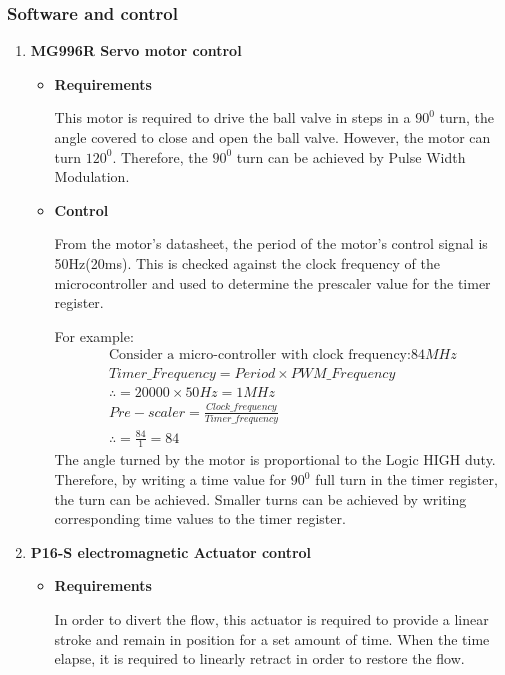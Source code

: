 \subsubsection{Software and control}

\begin{enumerate}
    \item \textbf{MG996R Servo motor control}
    \par
    \begin{itemize}
        \item \textbf{Requirements}
        \par
        This motor is required to drive the ball valve in steps in a $90^{0}$ turn, the angle covered to close and open the ball valve. However, the motor can turn $120^{0}$. Therefore, the $90^{0}$ turn can be achieved by Pulse Width Modulation. 
        \item \textbf{Control}
        \par
        From the motor's datasheet, the period of the motor's control signal is 50Hz(20ms). This is checked against the clock frequency of the microcontroller and used to determine the prescaler value for the timer register.
        \par
        For example:
        \begin{align*}
            \text{Consider a micro-controller with clock frequency:} 84MHz \\
            Timer\_Frequency = Period \times PWM\_Frequency\\
            \therefore = 20000 \times 50 Hz  = 1MHz\\
            Pre-scaler = \frac{Clock\_frequency}{Timer\_frequency}\\
            \therefore = \frac{84}{1} = 84
        \end{align*}
        The angle turned by the motor is proportional to the Logic HIGH duty. Therefore, by writing a time value for $90^{0}$ full turn in the timer register, the turn can be achieved. Smaller turns can be achieved by writing corresponding time values to the timer register.
    \end{itemize}
    \item \textbf{P16-S electromagnetic Actuator control}
    \par
    \begin{itemize}
        \item \textbf{Requirements}
        \par
        In order to divert the flow, this actuator is required to provide a linear stroke and remain in position for a set amount of time. When the time elapse, it is required to linearly retract in order to restore the flow. 

\end{itemize}
\end{enumerate}
